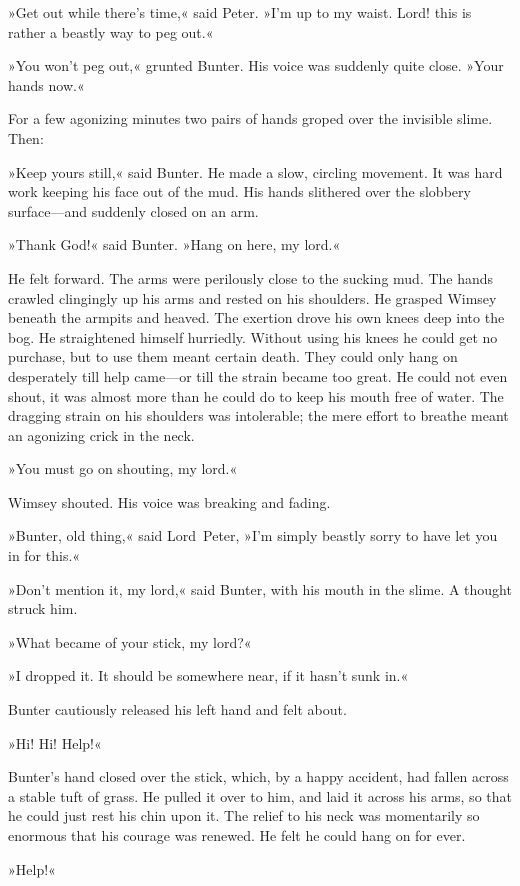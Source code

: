 »Get out while there's time,« said Peter. »I'm up to my waist. Lord!  this is rather a beastly way to peg out.«

»You won't peg out,« grunted Bunter. His voice was suddenly quite close. »Your hands now.«

For a few agonizing minutes two pairs of hands groped over the invisible slime. Then:

»Keep yours still,« said Bunter. He made a slow, circling movement. It was hard work keeping his face out of the mud. His hands slithered over the slobbery surface—and suddenly closed on an arm.

»Thank God!« said Bunter. »Hang on here, my lord.«

He felt forward. The arms were perilously close to the sucking mud. The hands crawled clingingly up his arms and rested on his shoulders. He grasped Wimsey beneath the armpits and heaved. The exertion drove his own knees deep into the bog. He straightened himself hurriedly. Without using his knees he could get no purchase, but to use them meant certain death. They could only hang on desperately till help came—or till the strain became too great. He could not even shout, it was almost more than he could do to keep his mouth free of water. The dragging strain on his shoulders was intolerable; the mere effort to breathe meant an agonizing crick in the neck.

»You must go on shouting, my lord.«

Wimsey shouted. His voice was breaking and fading.

»Bunter, old thing,« said Lord~Peter, »I'm simply beastly sorry to have let you in for this.«

»Don't mention it, my lord,« said Bunter, with his mouth in the slime.  A thought struck him.

»What became of your stick, my lord?«

»I dropped it. It should be somewhere near, if it hasn't sunk in.«

Bunter cautiously released his left hand and felt about.

»Hi! Hi! Help!«

Bunter's hand closed over the stick, which, by a happy accident, had fallen across a stable tuft of grass. He pulled it over to him, and laid it across his arms, so that he could just rest his chin upon it.  The relief to his neck was momentarily so enormous that his courage was renewed. He felt he could hang on for ever.

»Help!« 

